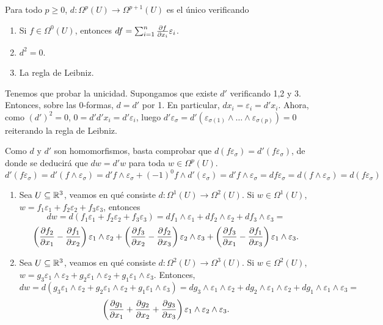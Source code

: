 \documentclass[CV.tex]{subfiles}
\begin{document}
\begin{teorema}
Para todo $p\geq 0$, $d:\Omega^p(U)\to\Omega^{p+1}(U)$ es el único verificando 
\begin{enumerate}
\item Si $f\in\Omega^0(U)$, entonces $df=\sum_{i=1}^n\frac{\partial f}{\partial x_i}\varepsilon_i$. 
\item $d^2=0$.
\item La regla de Leibniz.
\end{enumerate}
\end{teorema}
\begin{dem}
Tenemos que probar la unicidad. Supongamos que existe $d'$ verificando 1,2 y 3. Entonces, sobre las 0-formas, $d=d'$ por 1. En particular, $dx_i=\varepsilon_i=d'x_i$. Ahora, como $(d')^2=0$, $0=d'd'x_i=d'\varepsilon_i$, luego $d'\varepsilon_{\sigma}=d'(\varepsilon_{\sigma(1)}\land\dots\land\varepsilon_{\sigma(p)})=0$ reiterando la regla de Leibniz.  

Como $d$ y $d'$ son homomorfismos, basta comprobar que $d(f\varepsilon_{\sigma})=d'(f\varepsilon_{\sigma})$, de donde se deducirá que $dw=d'w$ para toda $w\in\Omega^p(U)$.  
\[
d'(f\varepsilon_{\sigma})=d'(f\land\varepsilon_{\sigma})=d'f\land\varepsilon_{\sigma}+(-1)^0f\land d'(\varepsilon_{\sigma})=d'f\land\varepsilon_{\sigma}=df\varepsilon_{\sigma}=d(f\land\varepsilon_{\sigma})=d(f\varepsilon_{\sigma})
\]
\QED
\end{dem}

\begin{ej}
\begin{enumerate}
\item Sea $U\subseteq\mathbb{R}^3$, veamos en qué consiste $d:\Omega^1(U)\to\Omega^2(U)$. Si $w\in\Omega^1(U)$, $w=f_1\varepsilon_1+f_2\varepsilon_2+f_3\varepsilon_3$, entonces 
\[dw=d(f_1\varepsilon_1+f_2\varepsilon_2+f_3\varepsilon_3)=df_1\land\varepsilon_1+df_2\land\varepsilon_2+df_3\land\varepsilon_3=
\]
\[
\left(\frac{\partial f_2}{\partial x_1}-\frac{\partial f_1}{\partial x_2}\right)\varepsilon_1\land\varepsilon_2+\left(\frac{\partial f_3}{\partial x_2}-\frac{\partial f_2}{\partial x_3}\right)\varepsilon_2\land\varepsilon_3+\left(\frac{\partial f_3}{\partial x_1}-\frac{\partial f_1}{\partial x_3}\right)\varepsilon_1\land\varepsilon_3.
\]
\item Sea $U\subseteq\mathbb{R}^3$, veamos en qué consiste $d:\Omega^2(U)\to\Omega^3(U)$. Si $w\in\Omega^2(U)$,
$w=g_3\varepsilon_1\land\varepsilon_2+g_2\varepsilon_1\land\varepsilon_2+g_1\varepsilon_1\land\varepsilon_3$. Entonces, 
\[
dw=d(g_3\varepsilon_1\land\varepsilon_2+g_2\varepsilon_1\land\varepsilon_2+g_1\varepsilon_1\land\varepsilon_3)=dg_3\land\varepsilon_1\land\varepsilon_2+dg_2\land\varepsilon_1\land\varepsilon_2+dg_1\land\varepsilon_1\land\varepsilon_3=
\]
\[
\left(\frac{\partial g_1}{\partial x_1}+\frac{\partial g_2}{\partial x_2}+\frac{\partial g_3}{\partial x_3}\right)\varepsilon_1\land\varepsilon_2\land\varepsilon_3.
\]
\end{enumerate}
\end{ej}
\end{document}
